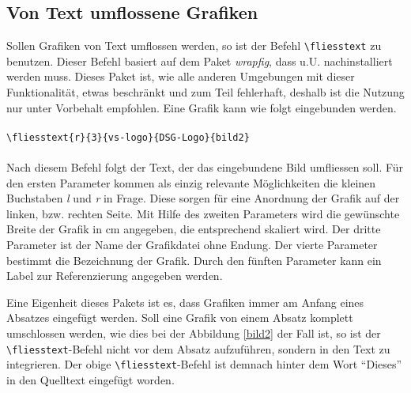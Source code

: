 \subsection{Von Text umflossene Grafiken}
%
Sollen Grafiken von Text umflossen werden, so ist der Befehl
\texttt{\textbackslash fliesstext} zu benutzen. Dieser Befehl basiert auf dem Paket
\emph{wrapfig}, dass u.U. nachinstalliert werden muss. Dieses
Paket ist, wie alle anderen Umgebungen mit dieser Funktionalität, etwas
beschränkt und zum Teil fehlerhaft, deshalb ist die Nutzung nur unter Vorbehalt
empfohlen. Eine Grafik kann wie folgt eingebunden werden.\\\\
\verb+\fliesstext{r}{3}{vs-logo}{DSG-Logo}{bild2}+\\\\
Nach diesem Befehl folgt der Text, der das eingebundene Bild umfliessen
soll. Für den ersten Parameter kommen als einzig relevante Möglichkeiten die
kleinen Buchstaben \emph{l} und \emph{r} in Frage. Diese sorgen für eine
Anordnung der Grafik auf der linken, bzw. rechten Seite. Mit Hilfe des zweiten
Parameters wird die gewünschte Breite der Grafik in cm angegeben, die
entsprechend skaliert wird. Der dritte Parameter ist der Name der Grafikdatei
ohne Endung. Der vierte Parameter bestimmt die Bezeichnung der Grafik. Durch den
fünften Parameter kann ein Label zur Referenzierung angegeben werden.

Eine Eigenheit dieses Pakets ist es, dass Grafiken immer am Anfang eines
Absatzes eingefügt werden. Soll eine Grafik von einem Absatz komplett
umschlossen werden, wie dies bei der Abbildung \ref{bild2} der Fall ist, so ist
der \texttt{\textbackslash fliesstext}-Befehl nicht vor dem Absatz aufzuführen, sondern in
den Text zu integrieren. Der obige \texttt{\textbackslash fliesstext}-Befehl ist demnach
hinter dem Wort "`Dieses"' in den Quelltext eingefügt worden.
%